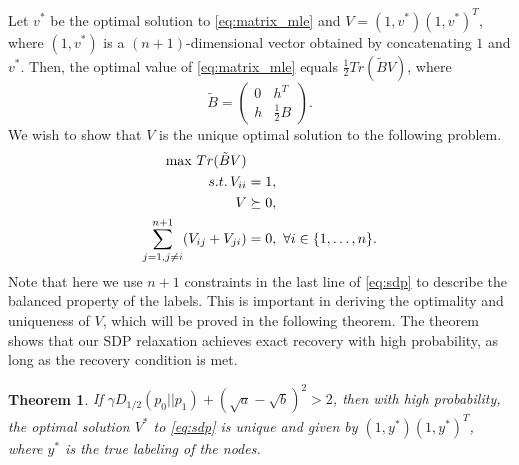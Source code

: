 \documentclass[conference]{IEEEtran}
\newtheorem{theorem}{Theorem}
\begin{document}
	Let $v^*$ be the optimal solution to \eqref{eq:matrix_mle} and $V=(1,v^*)(1,v^*)^T$, where $(1,v^*)$ is a $(n+1)$-dimensional  vector obtained by concatenating $1$ and $v^*$.
	Then, the optimal value of \eqref{eq:matrix_mle} equals $\frac{1}{2}Tr(\widetilde{B}V)$, where
	\begin{equation}\label{eq:B_lambda_def}
		\widetilde{B} = \begin{pmatrix} 0 & h^T  \\ h  & \frac{1}{2}B \end{pmatrix}.
	\end{equation}
	We wish to show that $V$ is the unique optimal solution to the following problem.
	\begin{align}
		\max\, Tr(\tilde{B}V)  &\notag\\
		s.t.\, V_{ii} &= 1, \notag\\
		V &\succeq 0, \notag\\
		\sum_{j=1,j\neq i}^{n+1} (V_{ij} + V_{ji})& = 0,~\forall i\in\{1,\ldots,n\}. \label{eq:sdp}
	\end{align}
	Note that here we use $n+1$ constraints in the last line of \eqref{eq:sdp} to describe the balanced property of the labels. This is important in deriving the optimality and uniqueness of $V$, which will be proved in the following theorem. The theorem shows that our SDP relaxation achieves exact recovery with high probability, as long as the recovery condition is met.
	\begin{theorem}\label{thm:sdp}
		If $\gamma D_{1/2}(p_0||p_1)  + (\sqrt{a} - \sqrt{b})^2 > 2$, then with high probability, the optimal solution
		$V^*$ to \eqref{eq:sdp} is unique and given by $(1,y^*)(1,y^*)^T$, where $y^*$ is the true labeling of the nodes.
	\end{theorem}
\end{document}
